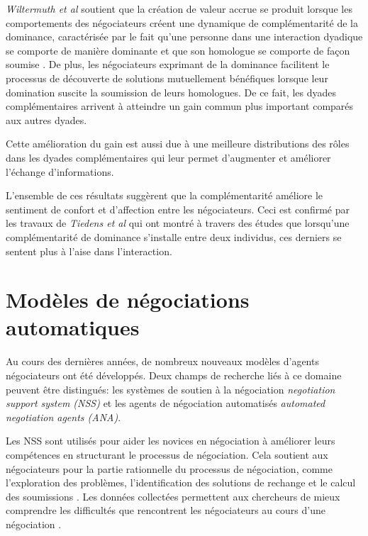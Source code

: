 	\emph{Wiltermuth et al} soutient que la création de valeur accrue se produit lorsque les comportements des négociateurs créent une dynamique de complémentarité de la dominance, caractérisée par le fait qu'une personne dans une interaction dyadique se comporte de manière dominante et que son homologue se comporte de façon soumise \cite{wiltermuth2015benefits}. De plus, les négociateurs exprimant de la dominance facilitent le processus de découverte de solutions mutuellement bénéfiques lorsque leur domination suscite la soumission de leurs homologues. De ce fait, les dyades complémentaires arrivent à atteindre un gain commun plus important comparés aux autres dyades.
	
	Cette amélioration du gain est aussi due à une meilleure distributions des rôles dans les dyades complémentaires qui leur permet d'augmenter et améliorer l'échange d'informations. 
	
	L'ensemble de ces résultats suggèrent que la complémentarité améliore le sentiment de confort et d'affection entre les négociateurs. Ceci est confirmé par les travaux de \emph{Tiedens et al} \cite{tiedens2003power} qui ont montré à travers des études que lorsqu'une complémentarité de dominance s'installe entre deux individus, ces derniers se sentent plus à l'aise dans l'interaction. 
	
	
	


	\section{Modèles de négociations automatiques}
	
	Au cours des dernières années, de nombreux nouveaux modèles d'agents négociateurs ont été développés. Deux champs de recherche liés à ce domaine peuvent être distingués: les systèmes de soutien à la négociation \emph{ negotiation support system (NSS)} et les agents de négociation automatisés \emph{automated negotiation agents (ANA)}.
	

	 Les NSS sont utilisés pour aider les novices en négociation à améliorer leurs compétences en structurant le processus de négociation. Cela soutient aux négociateurs pour la partie rationnelle du processus de négociation, comme l'exploration des problèmes, l'identification des solutions de rechange et le calcul des soumissions \cite{hindriks2008creating}. Les données collectées permettent aux chercheurs de mieux comprendre les difficultés que rencontrent les négociateurs au cours d'une négociation \cite{jonker2012negotiating}. 
	 
